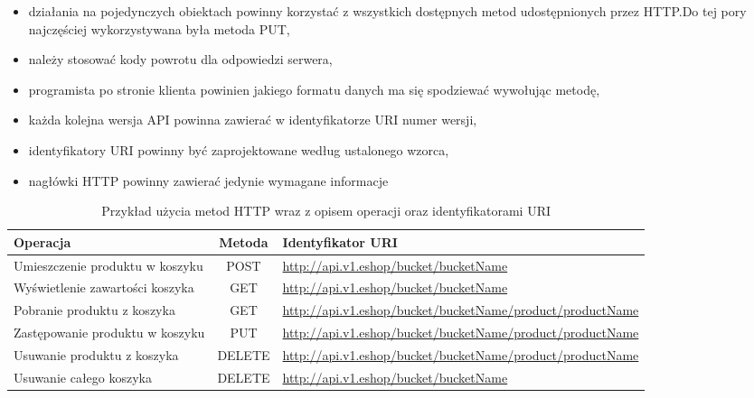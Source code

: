 \begin{itemize}
    \item działania na pojedynczych obiektach powinny korzystać z wszystkich dostępnych metod udostępnionych przez HTTP.\@ Do tej pory najczęściej wykorzystywana była metoda PUT,
    \item należy stosować kody powrotu dla odpowiedzi serwera,
    \item programista po stronie klienta powinien jakiego formatu danych ma się spodziewać wywołując metodę,
    \item każda kolejna wersja API powinna zawierać w identyfikatorze URI numer wersji,
    \item identyfikatory URI powinny być zaprojektowane według ustalonego wzorca,
    \item nagłówki HTTP powinny zawierać jedynie wymagane informacje
\end{itemize}
\begin{table}[h!]
    \begin{center}
        \caption{Przykład użycia metod HTTP wraz z opisem operacji oraz identyfikatorami URI}
        \hspace*{-1cm}
        \begin{tabular}{|M|c|L|}
            \toprule
            \textbf{Operacja}               & \textbf{Metoda} & \textbf{Identyfikator URI}                                      \\
            \midrule
            Umieszczenie produktu w koszyku & POST            & \url{http://api.v1.eshop/bucket/bucketName}                     \\
            \midrule
            Wyświetlenie zawartości koszyka & GET             & \url{http://api.v1.eshop/bucket/bucketName}                     \\
            \midrule
            Pobranie produktu z koszyka     & GET             & \url{http://api.v1.eshop/bucket/bucketName/product/productName} \\
            \midrule
            Zastępowanie produktu w koszyku & PUT             & \url{http://api.v1.eshop/bucket/bucketName/product/productName} \\
            \midrule
            Usuwanie produktu z koszyka     & DELETE          & \url{http://api.v1.eshop/bucket/bucketName/product/productName} \\
            \midrule
            Usuwanie całego koszyka         & DELETE          & \url{http://api.v1.eshop/bucket/bucketName}                     \\
            \bottomrule
        \end{tabular}
        \hspace*{-1cm}
    \end{center}
\end{table}

